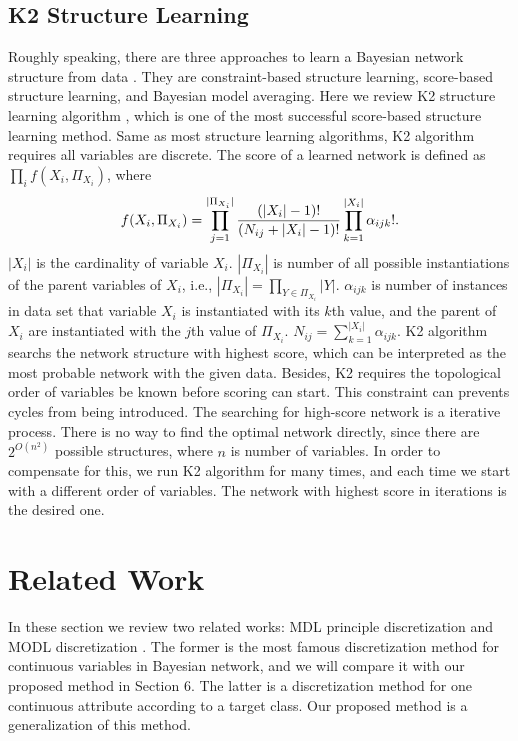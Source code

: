 \subsection{K2 Structure Learning}
\label{intro_K2}
Roughly speaking, there are three approaches to learn a Bayesian network structure from data \citep[see][chap.~18]{PGM_2009}. They are constraint-based structure learning, score-based structure learning, and Bayesian model averaging. Here we review K2 structure learning algorithm \citep{K2}, which is 
one of the most successful score-based structure learning method. Same as most structure learning algorithms, K2 algorithm requires all variables are discrete. The score of a learned network is defined as $\prod_i f(X_i, \Pi_{X_i})$, where
\begin{align}
f(X_i, \Pi_{X_i}) = \prod_{j=1}^{|\Pi_{X_i}|} {{(|X_i|-1)!}\over{(N_{ij} + |X_i|-1)!}} \prod_{k=1}^{|X_i|} \alpha_{ijk}!.
\end{align}
$|X_i|$ is the cardinality of variable $X_i$. $|\Pi_{X_i}|$ is number of all possible instantiations of the parent variables of $X_i$, i.e., $|\Pi_{X_i}| = \prod_{Y \in \Pi_{X_i}} |Y|$. $\alpha_{ijk}$ is number of instances in data set that variable $X_i$ is instantiated with its $k$th value, and the parent of $X_i$ are instantiated with the $j$th value of $\Pi_{X_i}$. $N_{ij} = \sum_{k=1}^{|X_i|} \alpha_{ijk}$. K2 algorithm searchs the network structure with highest score, which can be interpreted as the most probable network with the given data. Besides, K2 requires the topological order of variables be known before scoring can start. This constraint can prevents cycles from being introduced. The searching for high-score network is a iterative process. There is no way to find the optimal network directly, since there are $2^{O(n^2)}$ possible structures, where $n$ is number of variables. In order to compensate for this, we run K2 algorithm for many times, and each time we start with a different order of variables. The network with highest score in iterations is the desired one.

\section{Related Work}
\label{relat_work}
In these section we review two related works: MDL principle discretization \citep{Friedman_1996} and MODL discretization \citep{Boulle_2006}. The former is the most famous discretization method for continuous variables in Bayesian network, and we will compare it with our proposed method in Section 6. The latter is a discretization method for one continuous attribute according to a target class. Our proposed method is a generalization of this method.   

